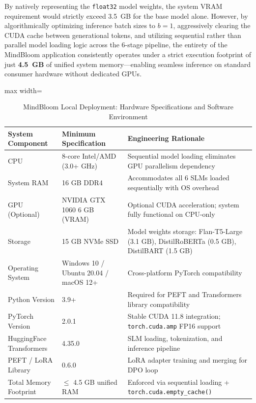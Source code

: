 \documentclass[12pt,twoside]{article}
\begin{document}
By natively representing the \texttt{float32} model weights, the system VRAM requirement would strictly exceed 3.5~GB for the base model alone. However, by algorithmically optimizing inference batch sizes to $b=1$, aggressively clearing the CUDA cache between generational tokens, and utilizing sequential rather than parallel model loading logic across the 6-stage pipeline, the entirety of the MindBloom application consistently operates under a strict execution footprint of just \textbf{4.5~GB} of unified system memory---enabling seamless inference on standard consumer hardware without dedicated GPUs.

\begin{table}[htbp]
\centering
\Large
\renewcommand{\arraystretch}{2.4}
\setlength{\tabcolsep}{12pt}
\begin{adjustbox}{max width=\textwidth}
\begin{tabular}{|p{5.5cm}|p{5.5cm}|p{8.0cm}|}
\hline
\rowcolor{gray!20}
\textbf{System Component} & \textbf{Minimum Specification} & \textbf{Engineering Rationale} \\
\hline
CPU & 8-core Intel/AMD (3.0+ GHz) & Sequential model loading eliminates GPU parallelism dependency \\
\hline
System RAM & 16 GB DDR4 & Accommodates all 6 SLMs loaded sequentially with OS overhead \\
\hline
GPU (Optional) & NVIDIA GTX 1060 6 GB (VRAM) & Optional CUDA acceleration; system fully functional on CPU-only \\
\hline
Storage & 15 GB NVMe SSD & Model weights storage: Flan-T5-Large (3.1 GB), DistilRoBERTa (0.5 GB), DistilBART (1.5 GB) \\
\hline
Operating System & Windows 10 / Ubuntu 20.04 / macOS 12+ & Cross-platform PyTorch compatibility \\
\hline
Python Version & 3.9+ & Required for PEFT and Transformers library compatibility \\
\hline
PyTorch Version & 2.0.1 & Stable CUDA 11.8 integration; \texttt{torch.cuda.amp} FP16 support \\
\hline
HuggingFace Transformers & 4.35.0 & SLM loading, tokenization, and inference pipeline \\
\hline
PEFT / LoRA Library & 0.6.0 & LoRA adapter training and merging for DPO loop \\
\hline
Total Memory Footprint & $\leq$ 4.5 GB unified RAM & Enforced via sequential loading + \texttt{torch.cuda.empty\_cache()} \\
\hline
\end{tabular}
\end{adjustbox}
\caption{MindBloom Local Deployment: Hardware Specifications and Software Environment}
\label{tab:hardware}
\end{table}
\end{document}
